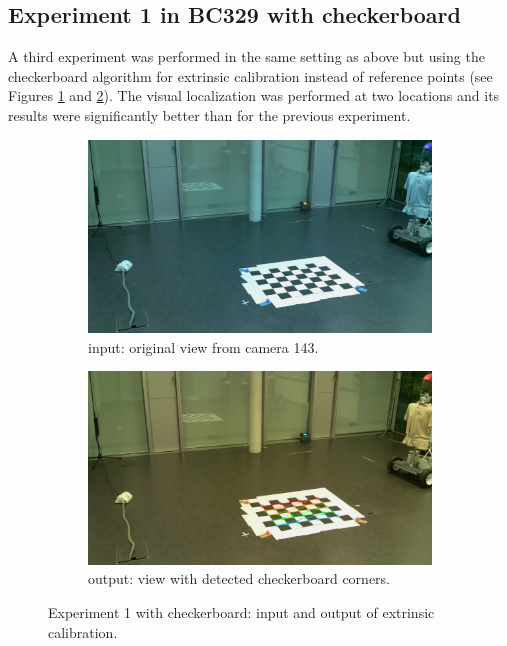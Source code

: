 \subsection{Experiment 1 in BC329 with checkerboard}

A third experiment was performed in the same setting as above but using the checkerboard algorithm for extrinsic calibration instead of reference points (see Figures \ref{fig:res2_image_143} and  \ref{fig:res2_output_143}). 
The visual localization was performed at two locations and its results were significantly better than for the previous experiment. 

\begin{figure}
    \centering
    \begin{subfigure}{0.49\linewidth}
        \centering
        \includegraphics[width=\linewidth]{files/res2_image_143.png}
        \caption{input: original view from camera 143.}
        \label{fig:res2_image_143}
    \end{subfigure}
    \begin{subfigure}{0.49\linewidth}
        \centering
        \includegraphics[width=\linewidth]{files/res2_output_143.jpg}
        \caption{output: view with detected checkerboard corners.}
        \label{fig:res2_output_143}
    \end{subfigure}
    \caption{Experiment 1 with checkerboard: input and output of extrinsic calibration.}
    \label{fig:experiment2}
\end{figure}

